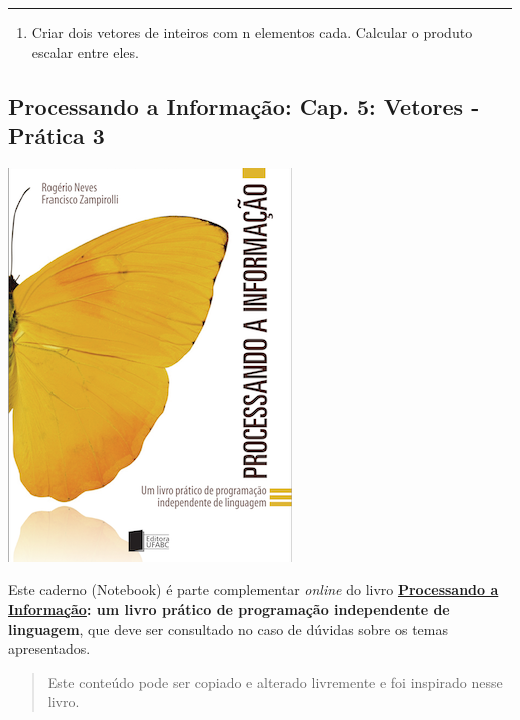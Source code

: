 \documentclass[12pt,a4paper]{article}
\providecommand{\tightlist}{%
      \setlength{\itemsep}{0pt}\setlength{\parskip}{0pt}}
\begin{document}
    \begin{center}\rule{0.5\linewidth}{0.5pt}\end{center}

\begin{enumerate}
\def\labelenumi{\arabic{enumi}.}
\setcounter{enumi}{4}
\tightlist
\item
  Criar dois vetores de inteiros com n elementos cada. Calcular o
  produto escalar entre eles.
\end{enumerate}

    \hypertarget{processando-a-informauxe7uxe3o-cap.-5-vetores---pruxe1tica-3}{%
\subsection{Processando a Informação: Cap. 5: Vetores - Prática
3}\label{processando-a-informauxe7uxe3o-cap.-5-vetores---pruxe1tica-3}}

    \includegraphics{"figs/Capa_Processando_Informacao.jpg"}

Este caderno (Notebook) é parte complementar \emph{online} do livro
\textbf{\href{https://editora.ufabc.edu.br/matematica-e-ciencias-da-computacao/58-processando-a-informacao}{Processando
a Informação}: um livro prático de programação independente de
linguagem}, que deve ser consultado no caso de dúvidas sobre os temas
apresentados.

\begin{quote}
Este conteúdo pode ser copiado e alterado livremente e foi inspirado
nesse livro.
\end{quote}
\end{document}
